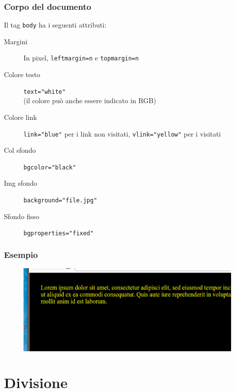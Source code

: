 \documentclass[]{beamer}
\begin{document}
\begin{frame}[fragile]
\frametitle{Corpo del documento}
Il tag \texttt{body} ha i seguenti attributi:
\begin{description}
    \item[Margini] In pixel, \texttt{leftmargin=n} e \texttt{topmargin=n}\pause
    \item[Colore testo] \texttt{text="white"}\\(il colore può anche essere indicato in RGB)\pause
    \item[Colore link] \texttt{link="blue"} per i link non visitati, \texttt{vlink="yellow"} per i visitati\pause
    \item[Col sfondo] \texttt{bgcolor="black"}\pause
    \item[Img sfondo] \texttt{background="file.jpg"}\pause
    \item[Sfondo fisso] \texttt{bgproperties="fixed"}
  \end{description}
\end{frame}




\begin{frame}[fragile]
\frametitle{Esempio}

\begin{figure}
\includegraphics[width=.7\columnwidth]{screenshots/corpo.png}
\end{figure}
\end{frame}


\section{Divisione}
\end{document}
